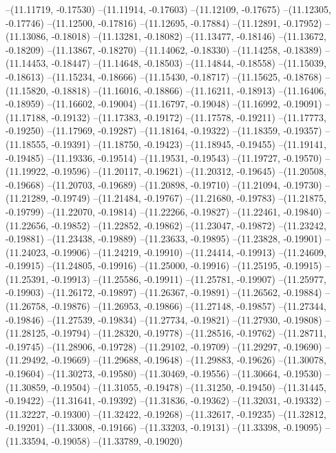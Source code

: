 --(11.11719, -0.17530)
--(11.11914, -0.17603)
--(11.12109, -0.17675)
--(11.12305, -0.17746)
--(11.12500, -0.17816)
--(11.12695, -0.17884)
--(11.12891, -0.17952)
--(11.13086, -0.18018)
--(11.13281, -0.18082)
--(11.13477, -0.18146)
--(11.13672, -0.18209)
--(11.13867, -0.18270)
--(11.14062, -0.18330)
--(11.14258, -0.18389)
--(11.14453, -0.18447)
--(11.14648, -0.18503)
--(11.14844, -0.18558)
--(11.15039, -0.18613)
--(11.15234, -0.18666)
--(11.15430, -0.18717)
--(11.15625, -0.18768)
--(11.15820, -0.18818)
--(11.16016, -0.18866)
--(11.16211, -0.18913)
--(11.16406, -0.18959)
--(11.16602, -0.19004)
--(11.16797, -0.19048)
--(11.16992, -0.19091)
--(11.17188, -0.19132)
--(11.17383, -0.19172)
--(11.17578, -0.19211)
--(11.17773, -0.19250)
--(11.17969, -0.19287)
--(11.18164, -0.19322)
--(11.18359, -0.19357)
--(11.18555, -0.19391)
--(11.18750, -0.19423)
--(11.18945, -0.19455)
--(11.19141, -0.19485)
--(11.19336, -0.19514)
--(11.19531, -0.19543)
--(11.19727, -0.19570)
--(11.19922, -0.19596)
--(11.20117, -0.19621)
--(11.20312, -0.19645)
--(11.20508, -0.19668)
--(11.20703, -0.19689)
--(11.20898, -0.19710)
--(11.21094, -0.19730)
--(11.21289, -0.19749)
--(11.21484, -0.19767)
--(11.21680, -0.19783)
--(11.21875, -0.19799)
--(11.22070, -0.19814)
--(11.22266, -0.19827)
--(11.22461, -0.19840)
--(11.22656, -0.19852)
--(11.22852, -0.19862)
--(11.23047, -0.19872)
--(11.23242, -0.19881)
--(11.23438, -0.19889)
--(11.23633, -0.19895)
--(11.23828, -0.19901)
--(11.24023, -0.19906)
--(11.24219, -0.19910)
--(11.24414, -0.19913)
--(11.24609, -0.19915)
--(11.24805, -0.19916)
--(11.25000, -0.19916)
--(11.25195, -0.19915)
--(11.25391, -0.19913)
--(11.25586, -0.19911)
--(11.25781, -0.19907)
--(11.25977, -0.19903)
--(11.26172, -0.19897)
--(11.26367, -0.19891)
--(11.26562, -0.19884)
--(11.26758, -0.19876)
--(11.26953, -0.19866)
--(11.27148, -0.19857)
--(11.27344, -0.19846)
--(11.27539, -0.19834)
--(11.27734, -0.19821)
--(11.27930, -0.19808)
--(11.28125, -0.19794)
--(11.28320, -0.19778)
--(11.28516, -0.19762)
--(11.28711, -0.19745)
--(11.28906, -0.19728)
--(11.29102, -0.19709)
--(11.29297, -0.19690)
--(11.29492, -0.19669)
--(11.29688, -0.19648)
--(11.29883, -0.19626)
--(11.30078, -0.19604)
--(11.30273, -0.19580)
--(11.30469, -0.19556)
--(11.30664, -0.19530)
--(11.30859, -0.19504)
--(11.31055, -0.19478)
--(11.31250, -0.19450)
--(11.31445, -0.19422)
--(11.31641, -0.19392)
--(11.31836, -0.19362)
--(11.32031, -0.19332)
--(11.32227, -0.19300)
--(11.32422, -0.19268)
--(11.32617, -0.19235)
--(11.32812, -0.19201)
--(11.33008, -0.19166)
--(11.33203, -0.19131)
--(11.33398, -0.19095)
--(11.33594, -0.19058)
--(11.33789, -0.19020)
